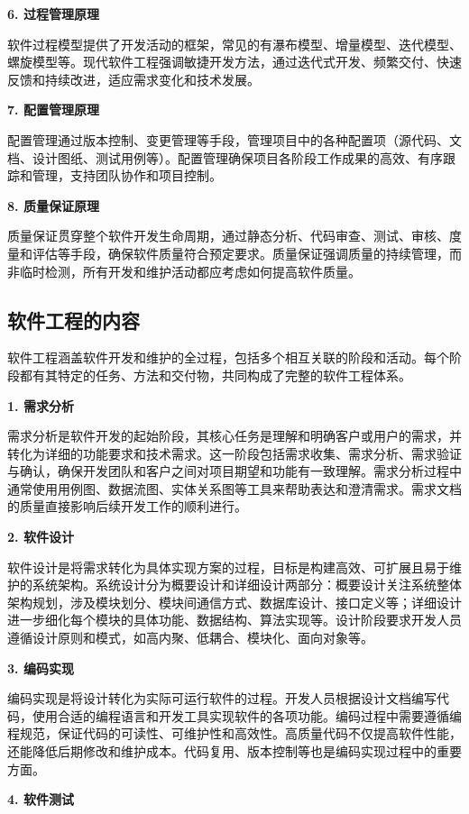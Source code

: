 \textbf{6. 过程管理原理}

软件过程模型提供了开发活动的框架，常见的有瀑布模型、增量模型、迭代模型、螺旋模型等。现代软件工程强调敏捷开发方法，通过迭代式开发、频繁交付、快速反馈和持续改进，适应需求变化和技术发展。

\textbf{7. 配置管理原理}

配置管理通过版本控制、变更管理等手段，管理项目中的各种配置项（源代码、文档、设计图纸、测试用例等）。配置管理确保项目各阶段工作成果的高效、有序跟踪和管理，支持团队协作和项目控制。

\textbf{8. 质量保证原理}

质量保证贯穿整个软件开发生命周期，通过静态分析、代码审查、测试、审核、度量和评估等手段，确保软件质量符合预定要求。质量保证强调质量的持续管理，而非临时检测，所有开发和维护活动都应考虑如何提高软件质量。

\subsection{软件工程的内容}

软件工程涵盖软件开发和维护的全过程，包括多个相互关联的阶段和活动。每个阶段都有其特定的任务、方法和交付物，共同构成了完整的软件工程体系。

\textbf{1. 需求分析}

需求分析是软件开发的起始阶段，其核心任务是理解和明确客户或用户的需求，并转化为详细的功能要求和技术需求。这一阶段包括需求收集、需求分析、需求验证与确认，确保开发团队和客户之间对项目期望和功能有一致理解。需求分析过程中通常使用用例图、数据流图、实体关系图等工具来帮助表达和澄清需求。需求文档的质量直接影响后续开发工作的顺利进行。

\textbf{2. 软件设计}

软件设计是将需求转化为具体实现方案的过程，目标是构建高效、可扩展且易于维护的系统架构。系统设计分为概要设计和详细设计两部分：概要设计关注系统整体架构规划，涉及模块划分、模块间通信方式、数据库设计、接口定义等；详细设计进一步细化每个模块的具体功能、数据结构、算法实现等。设计阶段要求开发人员遵循设计原则和模式，如高内聚、低耦合、模块化、面向对象等。

\textbf{3. 编码实现}

编码实现是将设计转化为实际可运行软件的过程。开发人员根据设计文档编写代码，使用合适的编程语言和开发工具实现软件的各项功能。编码过程中需要遵循编程规范，保证代码的可读性、可维护性和高效性。高质量代码不仅提高软件性能，还能降低后期修改和维护成本。代码复用、版本控制等也是编码实现过程中的重要方面。

\textbf{4. 软件测试}

